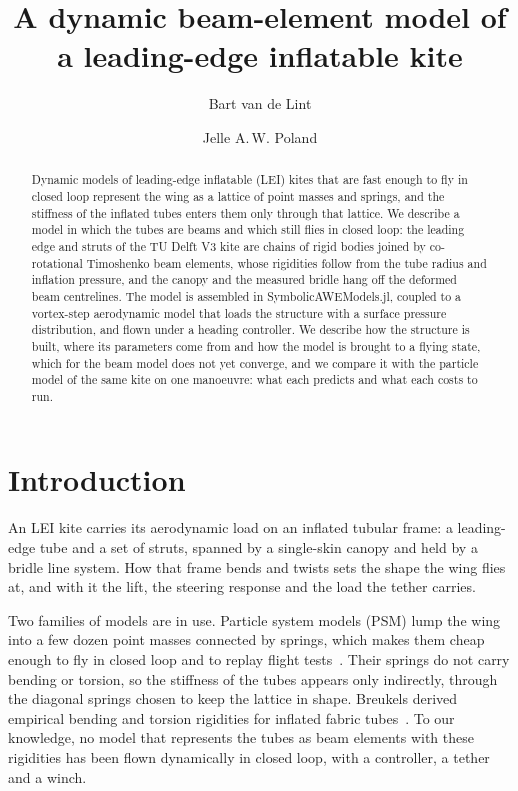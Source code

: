 \documentclass[11pt,a4paper]{article}
\title{A dynamic beam-element model of a leading-edge inflatable kite}
\author{Bart van de Lint \and Jelle A.\,W. Poland}
\date{}
\begin{document}
\maketitle

\begin{abstract}
Dynamic models of leading-edge inflatable (LEI) kites that are fast enough to fly in closed loop represent the wing as a lattice of point masses and springs, and the stiffness of the inflated tubes enters them only through that lattice. We describe a model in which the tubes are beams and which still flies in closed loop: the leading edge and struts of the TU Delft V3 kite are chains of rigid bodies joined by co-rotational Timoshenko beam elements, whose rigidities follow from the tube radius and inflation pressure, and the canopy and the measured bridle hang off the deformed beam centrelines. The model is assembled in SymbolicAWEModels.jl, coupled to a vortex-step aerodynamic model that loads the structure with a surface pressure distribution, and flown under a heading controller. We describe how the structure is built, where its parameters come from and how the model is brought to a flying state, which for the beam model does not yet converge, and we compare it with the particle model of the same kite on one manoeuvre: what each predicts and what each costs to run.
\end{abstract}

\section{Introduction}

An LEI kite carries its aerodynamic load on an inflated tubular frame: a leading-edge tube and a set of struts, spanned by a single-skin canopy and held by a bridle line system. How that frame bends and twists sets the shape the wing flies at, and with it the lift, the steering response and the load the tether carries.

Two families of models are in use. Particle system models (PSM) lump the wing into a few dozen point masses connected by springs, which makes them cheap enough to fly in closed loop and to replay flight tests~\cite{vandelint2026,poland2026}. Their springs do not carry bending or torsion, so the stiffness of the tubes appears only indirectly, through the diagonal springs chosen to keep the lattice in shape. Breukels derived empirical bending and torsion rigidities for inflated fabric tubes~\cite{breukels2011}. To our knowledge, no model that represents the tubes as beam elements with these rigidities has been flown dynamically in closed loop, with a controller, a tether and a winch.
\end{document}

